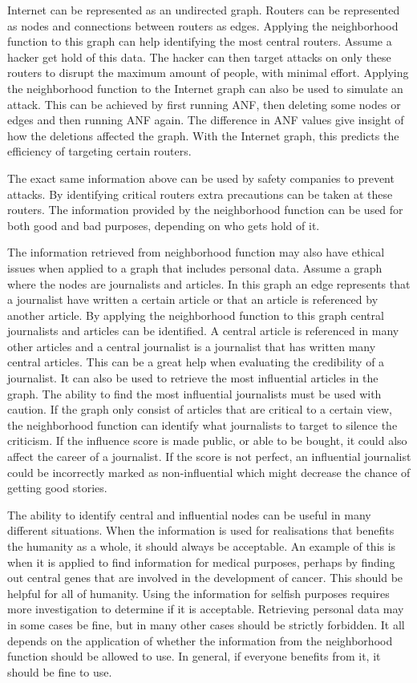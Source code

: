 Internet can be represented as an undirected graph. Routers can be represented as nodes and connections between routers as edges. Applying the neighborhood function to this graph can help identifying the most central routers. Assume a hacker get hold of this data. The hacker can then target attacks on only these routers to disrupt the maximum amount of people, with minimal effort. Applying the neighborhood function to the Internet graph can also be used to simulate an attack. This can be achieved by first running ANF, then deleting some nodes or edges and then running ANF again. The difference in ANF values give insight of how the deletions affected the graph. With the Internet graph, this predicts the efficiency of targeting certain routers. 

The exact same information above can be used by safety companies to prevent attacks. By identifying critical routers extra precautions can be taken at these routers. The information provided by the neighborhood function can be used for both good and bad purposes, depending on who gets hold of it.

The information retrieved from neighborhood function may also have ethical issues when applied to a graph that includes personal data. Assume a graph where the nodes are journalists and articles. In this graph an edge represents that a journalist have written a certain article or that an article is referenced by another article. By applying the neighborhood function to this graph central journalists and articles can be identified. A central article is referenced in many other articles and a central journalist is a journalist that has written many central articles. This can be a great help when evaluating the credibility of a journalist. It can also be used to retrieve the most influential articles in the graph. The ability to find the most influential journalists must be used with caution. If the graph only consist of articles that are critical to a certain view, the neighborhood function can identify what journalists to target to silence the criticism. If the influence score is made public, or able to be bought, it could also affect the career of a journalist. If the score is not perfect, an influential journalist could be incorrectly marked as non-influential which might decrease the chance of getting good stories.

The ability to identify central and influential nodes can be useful in many different situations. When the information is used for realisations that benefits the humanity as a whole, it should always be acceptable. An example of this is when it is applied to find information for medical purposes, perhaps by finding out central genes that are involved in the development of cancer. This should be helpful for all of humanity. Using the information for selfish purposes requires more investigation to determine if it is acceptable. Retrieving personal data may in some cases be fine, but in many other cases should be strictly forbidden. It all depends on the application of whether the information from the neighborhood function should be allowed to use. In general, if everyone benefits from it, it should be fine to use.
 
